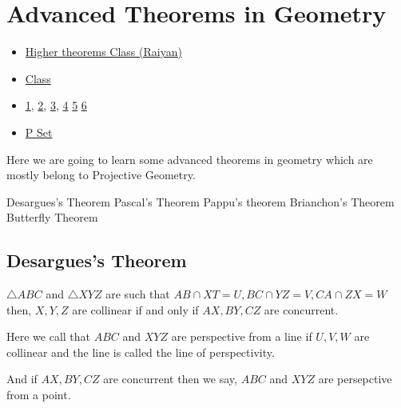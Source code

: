 \chapter{Advanced Theorems in Geometry}%

\begin{linkb}
   \begin{itemize}
        \item \href{https://www.youtube.com/watch?v=M5XK1DRmvQ4}{Higher theorems Class (Raiyan)}
        \item \href{https://drive.google.com/file/d/1re420K24_RUHWqmKCKolIOnNfHE_DdBx/view}{Class}
        \item \href{https://drive.google.com/file/d/1R0FYTojb1A0fsxsK4U5EbSqYgPjFNQjA/view}{1}, \href{https://drive.google.com/file/d/1jwEP2kMAX0CfU84L9MqnyQi-RkuCPndY/view}{2}, 
			\href{https://drive.google.com/file/d/1Xvko-uY1TfXguyLsI0SJyINVoQ6mLHOB/view}{3},
			\href{https://drive.google.com/file/d/1fm_irN-VGuGjgA4K2xioDTOWrRXyhwHh/view}{4}
			\href{https://drive.google.com/file/d/1j3XsSZXVlacnieq_bEXGKfBtYgxTPMks/view}{5} 
			\href{https://drive.google.com/file/d/11iIS0QZj-Ge798GngpVY1SDxKPipRfIA/view}{6}
			
			\item \href{https://drive.google.com/file/d/1JdYioYeJhqugbqTJBKTQL6XvSNxZh1bw/view}{P Set}
   \end{itemize}
\end{linkb}

Here we are going to learn some advanced theorems in geometry which are mostly belong to Projective Geometry.
\begin{itemize}
	\ii Desargues's Theorem
	\ii Pascal's Theorem
	\ii Pappu's theorem
	\ii Brianchon's Theorem
	\ii Butterfly Theorem
\end{itemize}
\section{Desargues's Theorem}
\begin{theorem}
$\triangle ABC$ and $\triangle XYZ $ are such that $AB\cap XT = U, BC\cap YZ =V, CA\cap ZX=W$ then, $X,Y, Z$ are collinear if and only if $AX,BY,CZ$ are concurrent.
\end{theorem}

Here we call that $ABC$ and $XYZ$ are perspective from a line if $U,V,W$ are collinear and the line is called the line of perspectivity. 

And if $AX,BY,CZ$ are concurrent then we say, $ABC$ and $XYZ$ are persepctive from a point. 

